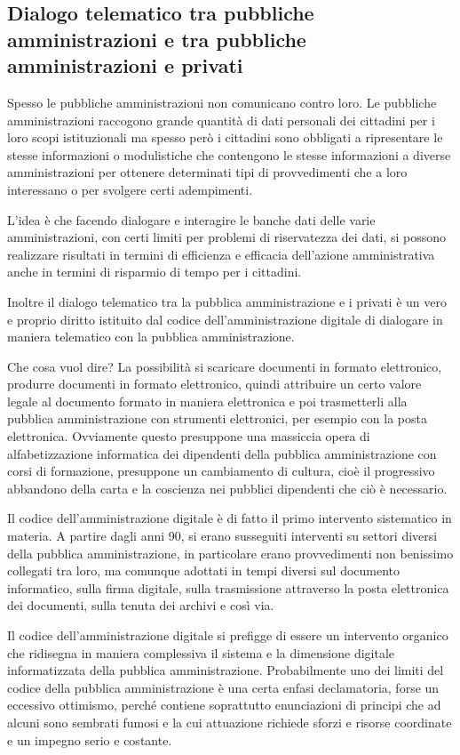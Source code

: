 \subsection{Dialogo telematico tra pubbliche amministrazioni e tra pubbliche amministrazioni e privati}

Spesso le pubbliche amministrazioni non comunicano contro loro. Le pubbliche amministrazioni raccogono grande quantità di dati personali dei cittadini per i loro scopi istituzionali ma spesso però i cittadini sono obbligati a ripresentare le stesse informazioni o modulistiche che contengono le stesse informazioni a diverse amministrazioni per ottenere determinati tipi di provvedimenti che a loro interessano o per svolgere certi adempimenti. 

L'idea è che facendo dialogare e interagire le banche dati delle varie amministrazioni, con certi limiti per problemi di riservatezza dei dati, si possono realizzare risultati in termini di efficienza e efficacia dell'azione amministrativa anche in termini di risparmio di tempo per i cittadini. 

Inoltre il dialogo telematico tra la pubblica amministrazione e i privati è un vero e proprio diritto istituito dal codice dell'amministrazione digitale di dialogare in maniera telematico con la pubblica amministrazione. 

Che cosa vuol dire? La possibilità si scaricare documenti in formato elettronico, produrre documenti in formato elettronico, quindi attribuire un certo valore legale al documento formato in maniera elettronica e poi trasmetterli alla pubblica amministrazione con strumenti elettronici, per esempio con la posta elettronica. 
Ovviamente questo presuppone una massiccia opera di alfabetizzazione informatica dei dipendenti della pubblica amministrazione con corsi di formazione, presuppone un cambiamento di cultura, cioè il progressivo abbandono della carta e la coscienza nei pubblici dipendenti che ciò è necessario. 

Il codice dell'amministrazione digitale è di fatto il primo intervento sistematico in materia. A partire dagli anni 90, si erano susseguiti interventi su settori diversi della pubblica amministrazione, in particolare erano provvedimenti non benissimo collegati tra loro, ma comunque adottati in tempi diversi sul documento informatico, sulla firma digitale, sulla trasmissione attraverso la posta elettronica dei documenti, sulla tenuta dei archivi e così via. 

Il codice dell'amministrazione digitale si prefigge di essere un intervento organico che ridisegna in maniera complessiva il sistema e la dimensione digitale informatizzata della pubblica amministrazione. 
Probabilmente uno dei limiti del codice della pubblica amministrazione è una certa enfasi declamatoria, forse un eccessivo ottimismo, perché contiene soprattutto enunciazioni di principi che ad alcuni sono sembrati fumosi e la cui attuazione richiede sforzi e risorse coordinate e un impegno serio e costante. 

